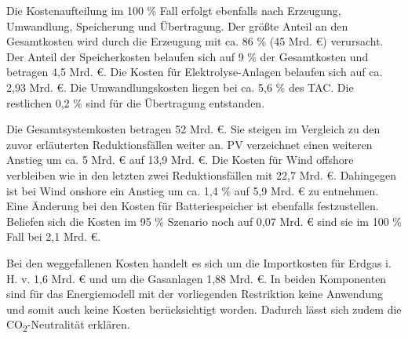 Die Kostenaufteilung im 100 \% Fall erfolgt ebenfalls nach Erzeugung, Umwandlung, Speicherung und Übertragung. Der größte Anteil an den Gesamtkosten wird durch die Erzeugung mit ca. 86 \% (45 Mrd. €) verursacht. Der Anteil der Speicherkosten belaufen sich auf 9 \% der Gesamtkosten und betragen 4,5 Mrd. €. Die Kosten für Elektrolyse-Anlagen belaufen sich auf ca. 2,93 Mrd. €. Die Umwandlungskosten liegen bei ca. 5,6 \% des TAC. Die restlichen 0,2 \% sind für die Übertragung entstanden. 

Die Gesamtsystemkosten betragen 52 Mrd. €. Sie steigen im Vergleich zu den zuvor erläuterten Reduktionsfällen weiter an. PV verzeichnet einen weiteren Anstieg um ca. 5 Mrd. € auf 13,9 Mrd. €. Die Kosten für Wind offshore verbleiben wie in den letzten zwei Reduktionsfällen mit 22,7 Mrd. €. Dahingegen ist bei Wind onshore ein Anstieg um ca. 1,4 \% auf 5,9 Mrd. € zu entnehmen. Eine Änderung bei den Kosten für Batteriespeicher ist ebenfalls festzustellen. Beliefen sich die Kosten im 95 \% Szenario noch auf 0,07 Mrd. € sind sie im 100 \% Fall bei 2,1 Mrd. €. 

Bei den weggefallenen Kosten handelt es sich um die Importkosten für Erdgas i. H. v. 1,6 Mrd. € und um die Gasanlagen 1,88 Mrd. €. In beiden Komponenten sind für das Energiemodell mit der vorliegenden Restriktion keine Anwendung und somit auch keine Kosten berücksichtigt worden. Dadurch lässt sich zudem die CO\textsubscript{2}-Neutralität erklären.

